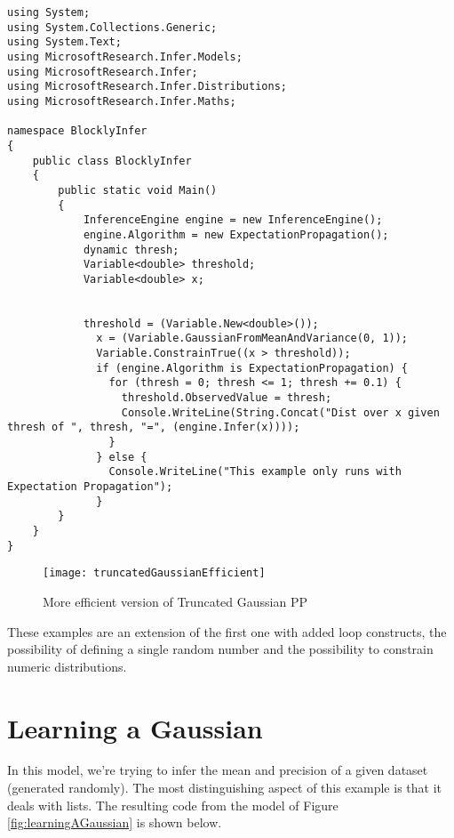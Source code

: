 \begin{lstlisting}
using System;
using System.Collections.Generic;
using System.Text;
using MicrosoftResearch.Infer.Models;
using MicrosoftResearch.Infer;
using MicrosoftResearch.Infer.Distributions;
using MicrosoftResearch.Infer.Maths;

namespace BlocklyInfer
{
	public class BlocklyInfer
	{
		public static void Main()
		{
			InferenceEngine engine = new InferenceEngine();
			engine.Algorithm = new ExpectationPropagation();
			dynamic thresh;
			Variable<double> threshold;
			Variable<double> x;


			threshold = (Variable.New<double>());
			  x = (Variable.GaussianFromMeanAndVariance(0, 1));
			  Variable.ConstrainTrue((x > threshold));
			  if (engine.Algorithm is ExpectationPropagation) {
			    for (thresh = 0; thresh <= 1; thresh += 0.1) {
			      threshold.ObservedValue = thresh;
			      Console.WriteLine(String.Concat("Dist over x given thresh of ", thresh, "=", (engine.Infer(x))));
			    }
			  } else {
			    Console.WriteLine("This example only runs with Expectation Propagation");
			  }
		}
	}
}
\end{lstlisting}

\begin{figure}[t]
  \begin{center}
    \leavevmode
    \texttt{[image: truncatedGaussianEfficient]}
    \caption{More efficient version of Truncated Gaussian PP}
    \label{fig:truncatedGaussianEfficient}
  \end{center}
\end{figure}

These examples are an extension of the first one with added loop constructs,
the possibility of defining a single random number and the possibility to constrain
numeric distributions.

\section{Learning a Gaussian}

In this model, we're trying to infer the mean and precision of a given dataset
(generated randomly). The most distinguishing aspect of this example is that it
deals with lists. The resulting code from the model of Figure \ref{fig:learningAGaussian}
is shown below.


